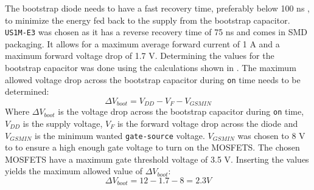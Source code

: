 The bootstrap diode needs to have a fast recovery time, preferably below 100 ns \cite{bootstrap_infineon}, to minimize the energy fed back to the supply from the bootstrap capacitor.
\texttt{US1M-E3} was chosen as it has a reverse recovery time of 75 ns and comes in SMD packaging. 
It allows for a maximum average forward current of 1 A and a maximum forward voltage drop of 1.7 V.
Determining the values for the bootstrap capacitor was done using the calculations shown in \cite{bootstrap_ON}.
The maximum allowed voltage drop across the bootstrap capacitor during \texttt{on} time needs to be determined: 
\begin{equation}
\Delta V_{boot} = V_{DD} - V_{F} - V_{GSMIN}
\end{equation}
Where $\Delta V_{boot}$ is the voltage drop across the bootstrap capacitor during \texttt{on} time, $V_{DD}$ is the supply voltage, $V_F$ is the forward voltage drop across the diode and $V_{GSMIN}$ is the minimum wanted \texttt{gate-source} voltage.
$V_{GSMIN}$ was chosen to 8 V to to ensure a high enough gate voltage to turn on the MOSFETS. 
The chosen MOSFETS have a maximum gate threshold voltage of 3.5 V. 
Inserting the values yields the maximum allowed value of $\Delta V_{boot}$:
\begin{equation}
\Delta V_{boot} = 12 - 1.7 - 8 = 2.3 V	
\end{equation}


